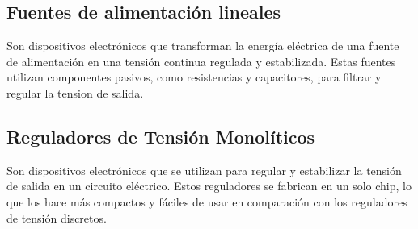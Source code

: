 \subsection{Fuentes de alimentación lineales}

Son dispositivos electrónicos que transforman la energía eléctrica de una fuente de alimentación en una tensión continua regulada y estabilizada. Estas fuentes utilizan componentes pasivos, como resistencias y capacitores, para filtrar y regular la tension de salida.

\subsection{Reguladores de Tensión Monolíticos}

Son dispositivos electrónicos que se utilizan para regular y estabilizar la tensión de salida en un circuito eléctrico. Estos reguladores se fabrican en un solo chip, lo que los hace más compactos y fáciles de usar en comparación con los reguladores de tensión discretos.